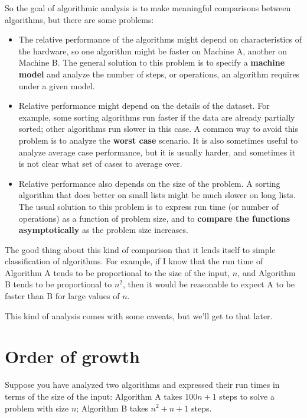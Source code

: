 \documentclass[10pt]{book}
\begin{document}
So the goal of algorithmic analysis is to make meaningful
comparisons between algorithms, but there are some problems:

\begin{itemize}

\item The relative performance of the algorithms might
depend on characteristics of the hardware, so one algorithm
might be faster on Machine A, another on Machine B.
The general solution to this problem is to specify a
{\bf machine model} and analyze the number of steps, or
operations, an algorithm requires under a given model.

\item Relative performance might depend on the details of
the dataset.  For example, some sorting
algorithms run faster if the data are already partially sorted;
other algorithms run slower in this case.
A common way to avoid this problem is to analyze the
{\bf worst case} scenario.  It is also sometimes useful to
analyze average case performance, but it is usually harder,
and sometimes it is not clear what set of cases to average over.

\item Relative performance also depends on the size of the
problem.  A sorting algorithm that does better on small lists
might be much slower on long lists.
The usual solution to this problem is to express run time
(or number of operations) as a function of problem size,
and to {\bf compare the functions asymptotically} as the problem
size increases.

\end{itemize}

The good thing about this kind of comparison that it lends
itself to simple classification of algorithms.  For example,
if I know that the run time of Algorithm A tends to be
proportional to the size of the input, $n$, and Algorithm B
tends to be proportional to $n^2$, then it would be reasonable
to expect A to be faster than B for large values of $n$.

This kind of analysis comes with some caveats, but we'll get
to that later.


\section{Order of growth}

Suppose you have analyzed two algorithms and expressed
their run times in terms of the size of the input:
Algorithm A takes $100 n + 1$ steps to solve a problem with
size $n$; Algorithm B takes $n^2 + n + 1$ steps.
\end{document}
